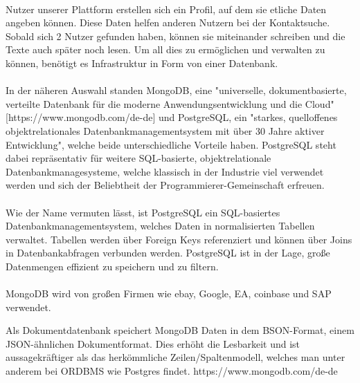 \paragraph{}
Nutzer unserer Plattform erstellen sich ein Profil, auf dem sie etliche Daten angeben können. Diese Daten helfen anderen Nutzern bei der Kontaktsuche. Sobald sich 2 Nutzer gefunden haben, können sie miteinander schreiben und die Texte auch später noch lesen. Um all dies zu ermöglichen und verwalten zu können, benötigt es Infrastruktur in Form von einer Datenbank.

\paragraph{}
In der näheren Auswahl standen MongoDB, eine "universelle, dokumentbasierte, verteilte Datenbank für die moderne Anwendungsentwicklung und die Cloud" [https://www.mongodb.com/de-de] und PostgreSQL, ein "starkes, quelloffenes objektrelationales Datenbankmanagementsystem mit über 30 Jahre aktiver Entwicklung", welche beide unterschiedliche Vorteile haben. PostgreSQL steht dabei repräsentativ für weitere SQL-basierte, objektrelationale Datenbankmanagesysteme, welche klassisch in der Industrie viel verwendet werden und sich der Beliebtheit der Programmierer-Gemeinschaft erfreuen.

\paragraph{}
Wie der Name vermuten lässt, ist PostgreSQL ein SQL-basiertes Datenbankmanagementsystem, welches Daten in normalisierten Tabellen verwaltet. Tabellen werden über Foreign Keys referenziert und können über Joins in Datenbankabfragen verbunden werden. PostgreSQL ist in der Lage, große Datenmengen effizient zu speichern und zu filtern.

\paragraph{}
MongoDB wird von großen Firmen wie ebay, Google, EA, coinbase und SAP verwendet.

Als Dokumentdatenbank speichert MongoDB Daten in dem BSON-Format, einem JSON-ähnlichen Dokumentformat. Dies erhöht die Lesbarkeit und ist aussagekräftiger als das herkömmliche Zeilen/Spaltenmodell, welches man unter anderem bei ORDBMS wie Postgres findet. https://www.mongodb.com/de-de

